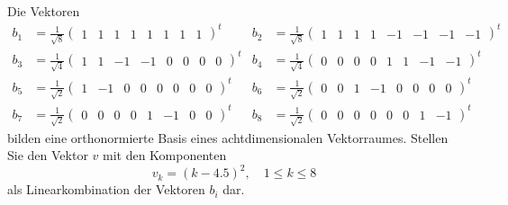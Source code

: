 Die Vektoren
\begin{align*}
b_1&=\frac1{\sqrt{8}} \begin{pmatrix}1&1&1&1&1&1&1&1\end{pmatrix}^t&
b_2&=\frac1{\sqrt{8}} \begin{pmatrix}1&1&1&1&-1&-1&-1&-1\end{pmatrix}^t\\
b_3&=\frac1{\sqrt{4}} \begin{pmatrix}1&1&-1&-1&0&0&0&0\end{pmatrix}^t&
b_4&=\frac1{\sqrt{4}} \begin{pmatrix} 0&0&0&0&1&1&-1&-1\end{pmatrix}^t\\
b_5&=\frac1{\sqrt{2}} \begin{pmatrix}1&-1&0&0&0&0&0&0\end{pmatrix}^t&
b_6&=\frac1{\sqrt{2}} \begin{pmatrix}0&0&1&-1&0&0&0&0\end{pmatrix}^t\\
b_7&=\frac1{\sqrt{2}} \begin{pmatrix}0&0&0&0&1&-1&0&0\end{pmatrix}^t&
b_8&=\frac1{\sqrt{2}} \begin{pmatrix}0&0&0&0&0&0&1&-1\end{pmatrix}^t
\end{align*}
bilden eine orthonormierte Basis eines achtdimensionalen Vektorraumes.
Stellen Sie den Vektor $v$ mit den Komponenten
\[
v_k=(k-4.5)^2,\quad{1\le k\le 8}
\]
als Linearkombination der Vektoren $b_i$ dar.

